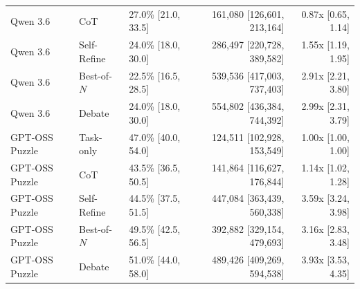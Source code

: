 \begin{table}[H]
{\begin{tabular}{@{}lllrr@{}}
Qwen 3.6 & CoT & 27.0\% [21.0, 33.5] & 161,080 [126,601, 213,164] & 0.87x [0.65, 1.14] \\
Qwen 3.6 & Self-Refine & 24.0\% [18.0, 30.0] & 286,497 [220,728, 389,582] & 1.55x [1.19, 1.95] \\
Qwen 3.6 & Best-of-$N$ & 22.5\% [16.5, 28.5] & 539,536 [417,003, 737,403] & 2.91x [2.21, 3.80] \\
Qwen 3.6 & Debate & 24.0\% [18.0, 30.0] & 554,802 [436,384, 744,392] & 2.99x [2.31, 3.79] \\
GPT-OSS Puzzle & Task-only & 47.0\% [40.0, 54.0] & 124,511 [102,928, 153,549] & 1.00x [1.00, 1.00] \\
GPT-OSS Puzzle & CoT & 43.5\% [36.5, 50.5] & 141,864 [116,627, 176,844] & 1.14x [1.02, 1.28] \\
GPT-OSS Puzzle & Self-Refine & 44.5\% [37.5, 51.5] & 447,084 [363,439, 560,338] & 3.59x [3.24, 3.98] \\
GPT-OSS Puzzle & Best-of-$N$ & 49.5\% [42.5, 56.5] & 392,882 [329,154, 479,693] & 3.16x [2.83, 3.48] \\
GPT-OSS Puzzle & Debate & 51.0\% [44.0, 58.0] & 489,426 [409,269, 594,538] & 3.93x [3.53, 4.35] \\
\bottomrule
\end{tabular}}
\end{table}

